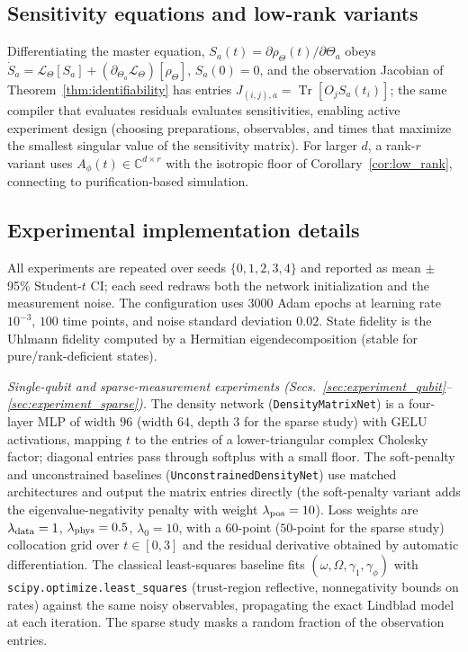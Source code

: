\documentclass[11pt]{article}
\DeclareMathOperator{\Tr}{Tr}
\newcommand{\C}{\mathbb{C}}
\newcommand{\calL}{\mathcal{L}}
\begin{document}
\subsection{Sensitivity equations and low-rank variants}
\label{sec:sensitivity_equations}
Differentiating the master equation, $S_a(t)=\partial\rho_\Theta(t)/\partial\Theta_a$ obeys $\dot S_a=\calL_\Theta[S_a]+(\partial_{\Theta_a}\calL_\Theta)[\rho_\Theta]$, $S_a(0)=0$, and the observation Jacobian of Theorem~\ref{thm:identifiability} has entries $J_{(i,j),a}=\Tr[O_j S_a(t_i)]$; the same compiler that evaluates residuals evaluates sensitivities, enabling active experiment design (choosing preparations, observables, and times that maximize the smallest singular value of the sensitivity matrix). For larger $d$, a rank-$r$ variant uses $A_\phi(t)\in\C^{d\times r}$ with the isotropic floor of Corollary~\ref{cor:low_rank}, connecting to purification-based simulation.

\subsection{Experimental implementation details}
\label{sec:appendix_experiments}
All experiments are repeated over seeds $\{0,1,2,3,4\}$ and reported as mean $\pm$ 95\% Student-$t$ CI; each seed redraws both the network initialization and the measurement noise. The configuration uses $3000$ Adam epochs at learning rate $10^{-3}$, $100$ time points, and noise standard deviation $0.02$. State fidelity is the Uhlmann fidelity computed by a Hermitian eigendecomposition (stable for pure/rank-deficient states).

\emph{Single-qubit and sparse-measurement experiments (Secs.~\ref{sec:experiment_qubit}--\ref{sec:experiment_sparse}).} The density network (\texttt{DensityMatrixNet}) is a four-layer MLP of width $96$ (width $64$, depth $3$ for the sparse study) with GELU activations, mapping $t$ to the entries of a lower-triangular complex Cholesky factor; diagonal entries pass through softplus with a small floor. The soft-penalty and unconstrained baselines (\texttt{UnconstrainedDensityNet}) use matched architectures and output the matrix entries directly (the soft-penalty variant adds the eigenvalue-negativity penalty with weight $\lambda_{\rm pos}=10$). Loss weights are $\lambda_{\rm data}=1$, $\lambda_{\rm phys}=0.5$, $\lambda_0=10$, with a $60$-point ($50$-point for the sparse study) collocation grid over $t\in[0,3]$ and the residual derivative obtained by automatic differentiation. The classical least-squares baseline fits $(\omega,\Omega,\gamma_1,\gamma_\phi)$ with \texttt{scipy.optimize.least\_squares} (trust-region reflective, nonnegativity bounds on rates) against the same noisy observables, propagating the exact Lindblad model at each iteration. The sparse study masks a random fraction of the observation entries.
\end{document}
